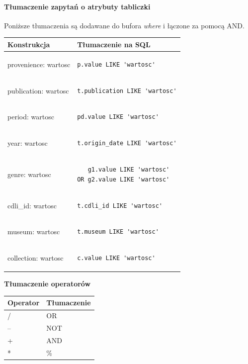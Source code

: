 \paragraph{Tłumaczenie zapytań o atrybuty tabliczki}
Poniższe tłumaczenia są dodawane do bufora \textit{where} i łączone za pomocą AND.
\begin{longtable}{|p{3in}|p{3in}|}
\hline
{\bf Konstrukcja} & {\bf Tłumaczenie na SQL}\\
\hline
\endhead
provenience: wartosc & \begin{verbatim}p.value LIKE 'wartosc'\end{verbatim}
\\
\hline
publication: wartosc & 
\begin{verbatim}
t.publication LIKE 'wartosc'
\end{verbatim}
\\
\hline
period: wartosc & 
\begin{verbatim}
pd.value LIKE 'wartosc'
\end{verbatim}
\\
\hline
year: wartosc & 
\begin{verbatim}
t.origin_date LIKE 'wartosc'
\end{verbatim}
\\
\hline
genre: wartosc & 
\begin{verbatim}
   g1.value LIKE 'wartosc' 
OR g2.value LIKE 'wartosc'
\end{verbatim}
\\
\hline
cdli\_id: wartosc & 
\begin{verbatim}
t.cdli_id LIKE 'wartosc'
\end{verbatim}
\\
\hline
museum: wartosc & 
\begin{verbatim}
t.museum LIKE 'wartosc'
\end{verbatim}
\\
\hline
collection: wartosc & 
\begin{verbatim}
c.value LIKE 'wartosc'
\end{verbatim}
\\
\hline
\end{longtable}

\textbf{Tłumaczenie operatorów}
\begin{longtable}{|p{1in}|p{1in}|}
\hline
{\bf Operator} & {\bf Tłumaczenie}\\
\hline
\endhead
/ & OR\\ 
\hline
-- & NOT\\ 
\hline
+ & AND\\ 
\hline
* & \%  \\ 
\hline
\end{longtable}


